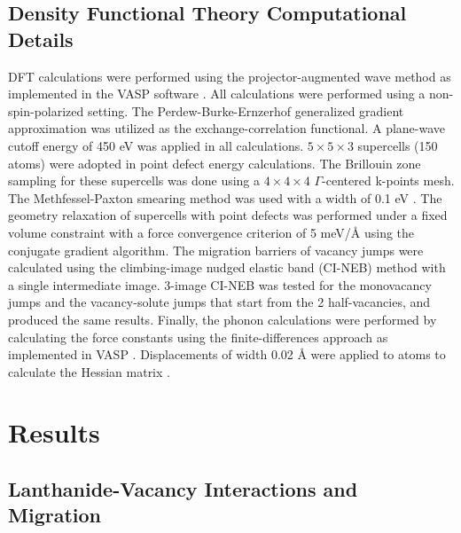 \documentclass[preprint,12pt]{elsarticle}
\begin{document}
\FloatBarrier

\subsection{Density Functional Theory Computational Details}

DFT calculations were performed using the projector-augmented wave method \cite{blochl_projector_1994} as implemented in the VASP software \cite{kresse_ab_1993, kresse_efficient_1996}. All calculations were performed using a non-spin-polarized setting. The Perdew-Burke-Ernzerhof generalized gradient approximation \cite{perdew_generalized_1996} was utilized as the exchange-correlation functional. A plane-wave cutoff energy of 450 eV was applied in all calculations. $5\times5\times3$ supercells (150 atoms) were adopted in point defect energy calculations. The Brillouin zone sampling for these supercells was done using a $4\times4\times4$ $\Gamma$-centered k-points mesh. The Methfessel-Paxton smearing method was used with a width of 0.1 eV  \cite{methfessel_high-precision_1989}. The geometry relaxation of supercells with point defects was performed under a fixed volume constraint with a force convergence criterion of 5 meV/{\AA} using the conjugate gradient algorithm. The migration barriers of vacancy jumps were calculated using the climbing-image nudged elastic band (CI-NEB) method \cite{henkelman_climbing_2000} with a single intermediate image. 3-image CI-NEB was tested for the monovacancy jumps and the vacancy-solute jumps that start from the 2 half-vacancies, and produced the same results. Finally, the phonon calculations were performed by calculating the force constants using the finite-differences approach as implemented in VASP \cite{kresse_ab_1993,kresse_efficient_1996}. Displacements of width 0.02 {\AA} were applied to atoms to calculate the Hessian matrix \cite{hafner_ab-initio_2008}.

\FloatBarrier

\section{Results}
\label{results}

\subsection{Lanthanide-Vacancy Interactions and Migration}
\end{document}
